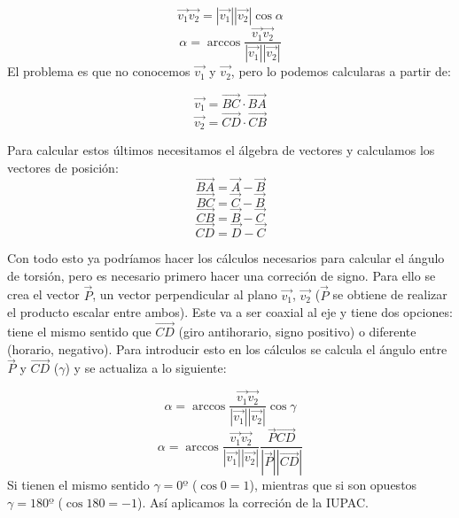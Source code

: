 \documentclass[a4paper,11pt]{report}
\begin{document}
 \begin{equation}
 	\vec{v_1} \vec{v_2} = |	\vec{v_1}||\vec{v_2}|\cos\alpha
 \end{equation}
\begin{equation}
	\alpha= \arccos \frac{\vec{v_1}\vec{v_2}}{|\vec{v_1}||\vec{v_2}|}
\end{equation}
El problema es que no conocemos $\vec{v_1}$ y $\vec{v_2}$, pero lo podemos calcularas a partir de:

\begin{equation}
	\vec{v_1} = \vec{BC} \cdot \vec{BA}
\end{equation}
\begin{equation}
	\vec{v_2} = \vec{CD} \cdot \vec{CB}
\end{equation}

Para calcular estos últimos necesitamos el álgebra de vectores y calculamos los vectores de posición:
\begin{equation}
	\vec{BA} = \vec{A} - \vec{B}
\end{equation}
\begin{equation}
	\vec{BC} = \vec{C} - \vec{B}
\end{equation}
\begin{equation}
	\vec{CB} = \vec{B} - \vec{C}
\end{equation}
\begin{equation}
	\vec{CD} = \vec{D} - \vec{C}
\end{equation}
 
 Con todo esto ya podríamos hacer los cálculos necesarios para calcular el ángulo de torsión, pero es necesario primero hacer una correción de signo. Para ello se crea el vector $\vec{P}$, un vector perpendicular al plano $\vec{v_1}$, $\vec{v_2}$ ($\vec{P}$ se obtiene de realizar el producto escalar entre ambos). Este va a ser coaxial al eje y tiene dos opciones: tiene el mismo sentido que $\vec{CD}$ (giro antihorario, signo positivo) o diferente (horario, negativo). Para introducir esto en los cálculos se calcula el ángulo entre $\vec{P}$ y $\vec{CD}$ ($\gamma$) y se actualiza a lo siguiente:

 \begin{equation}
 	\alpha= \arccos \frac{\vec{v_1}\vec{v_2}}{|\vec{v_1}||\vec{v_2}|} \cos \gamma
 \end{equation}
 \begin{equation}
	\alpha= \arccos \frac{\vec{v_1}\vec{v_2}}{|\vec{v_1}||\vec{v_2}|} \frac{\vec{P}\vec{CD}}{|\vec{P}||\vec{CD}|}  
\end{equation}
Si tienen el mismo sentido $\gamma = 0º$ ($\cos0= 1$), mientras que si son opuestos $\gamma = 180º$ ($\cos180= -1$). Así aplicamos la correción de la IUPAC.
\end{document}

